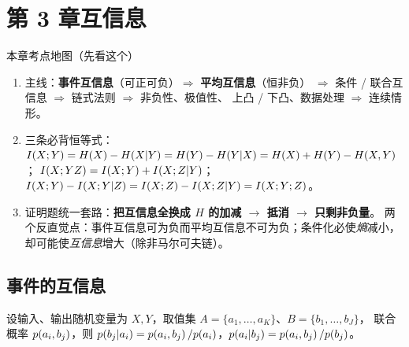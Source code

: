 \setcounter{section}{2}

\section{第 3 章\quad 互信息}

\begin{keypoint}{本章考点地图（先看这个）}
\begin{enumerate}[leftmargin=1.6em,itemsep=0pt,topsep=1pt]
  \item 主线：\textbf{事件互信息}（可正可负）$\Rightarrow$ \textbf{平均互信息}（恒非负）
        $\Rightarrow$ 条件 / 联合互信息 $\Rightarrow$ 链式法则 $\Rightarrow$ 非负性、极值性、
        上凸 / 下凸、数据处理 $\Rightarrow$ 连续情形。
  \item 三条必背恒等式：$\I{X;Y}=\Hx{X}-\Hx{X|Y}=\Hx{Y}-\Hx{Y|X}=\Hx{X}+\Hx{Y}-\Hx{X,Y}$；
        $I\!\left(X;YZ\right)=I\!\left(X;Y\right)+I\!\left(X;Z|Y\right)$；
        $I\!\left(X;Y\right)-I\!\left(X;Y|Z\right)=I\!\left(X;Z\right)-I\!\left(X;Z|Y\right)=I\!\left(X;Y;Z\right)$。
  \item 证明题统一套路：\textbf{把互信息全换成 $H$ 的加减 $\to$ 抵消 $\to$ 只剩非负量}。
        两个反直觉点：事件互信息可为负而平均互信息不可为负；条件化必使\emph{熵}减小，
        却可能使\emph{互信息}增大（除非马尔可夫链）。
\end{enumerate}
\end{keypoint}

\subsection{事件的互信息}

设输入、输出随机变量为 $X,Y$，取值集 $A=\{a_1,\dots,a_K\}$、$B=\{b_1,\dots,b_J\}$，
联合概率 $p\!\left(a_i,b_j\right)$，则
$p\!\left(b_j|a_i\right)=p\!\left(a_i,b_j\right)/p\!\left(a_i\right)$，$p\!\left(a_i|b_j\right)=p\!\left(a_i,b_j\right)/p\!\left(b_j\right)$。

